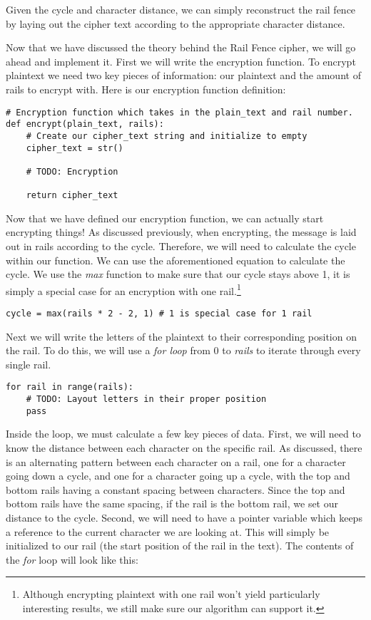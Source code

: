 Given the cycle and character distance, we can simply reconstruct the rail fence by laying out the cipher
text according to the appropriate character distance. 

Now that we have discussed the theory behind the Rail Fence cipher, we will go ahead and implement it.
First we will write the encryption function. To encrypt plaintext we need two key pieces of information:
our plaintext and the amount of rails to encrypt with. Here is our encryption function definition:

\begin{verbatim}
# Encryption function which takes in the plain_text and rail number.
def encrypt(plain_text, rails):
    # Create our cipher_text string and initialize to empty
    cipher_text = str()

    # TODO: Encryption

    return cipher_text
\end{verbatim}

Now that we have defined our encryption function, we can actually start encrypting things! As discussed previously,
when encrypting, the message is laid out in rails according to the cycle. Therefore, we will need to calculate the cycle
within our function. We can use the aforementioned equation to calculate the cycle. We use the \textit{max} function to 
make sure that our cycle stays above 1, it is simply a special case for an encryption with one rail.\footnote{Although 
encrypting plaintext with one rail won't yield particularly interesting results, we still make sure our algorithm can 
support it.}

\begin{verbatim}
cycle = max(rails * 2 - 2, 1) # 1 is special case for 1 rail    
\end{verbatim}

Next we will write the letters of the plaintext to their corresponding position on the rail. 
To do this, we will use a \textit{for loop} from 0 to \textit{rails} to iterate through every single rail.  

\begin{verbatim}
for rail in range(rails):
    # TODO: Layout letters in their proper position
    pass
\end{verbatim}

Inside the loop, we must calculate a few key pieces of data. First, we will need to know the distance between 
each character on the specific rail. As discussed, there is an alternating pattern between each character on a rail,
one for a character going down a cycle, and one for a character going up a cycle, with the top and bottom rails
having a constant spacing between characters. Since the top and bottom rails have the same spacing, if the rail
is the bottom rail, we set our distance to the cycle. Second, we will need to have a pointer variable which
keeps a reference to the current character we are looking at. This will simply be initialized to our rail (the start position
of the rail in the text). The contents of the \textit{for} loop will look like this:

